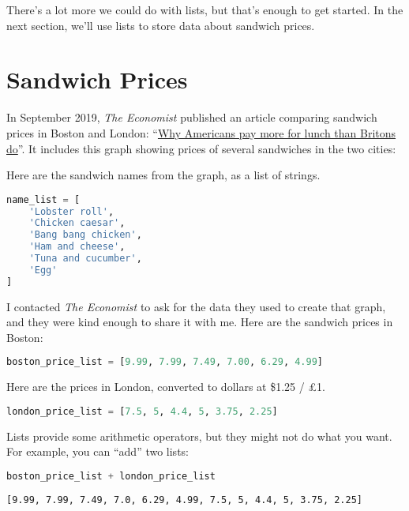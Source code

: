 There's a lot more we could do with lists, but that's enough to get
started. In the next section, we'll use lists to store data about
sandwich prices.

\hypertarget{sandwich-prices}{%
\section{Sandwich Prices}\label{sandwich-prices}}

In September 2019, \emph{The Economist} published an article comparing
sandwich prices in Boston and London:
``\href{https://www.economist.com/finance-and-economics/2019/09/07/why-americans-pay-more-for-lunch-than-britons-do}{Why
Americans pay more for lunch than Britons do}''. It includes this graph
showing prices of several sandwiches in the two cities:

Here are the sandwich names from the graph, as a list of strings.

\begin{lstlisting}[language=Python,style=source]
name_list = [
    'Lobster roll',
    'Chicken caesar',
    'Bang bang chicken',
    'Ham and cheese',
    'Tuna and cucumber',
    'Egg'
]
\end{lstlisting}

I contacted \emph{The Economist} to ask for the data they used to create
that graph, and they were kind enough to share it with me. Here are the
sandwich prices in Boston:

\begin{lstlisting}[language=Python,style=source]
boston_price_list = [9.99, 7.99, 7.49, 7.00, 6.29, 4.99]
\end{lstlisting}

Here are the prices in London, converted to dollars at \$1.25 / £1.

\begin{lstlisting}[language=Python,style=source]
london_price_list = [7.5, 5, 4.4, 5, 3.75, 2.25]
\end{lstlisting}

Lists provide some arithmetic operators, but they might not do what you
want. For example, you can ``add'' two lists:

\begin{lstlisting}[language=Python,style=source]
boston_price_list + london_price_list
\end{lstlisting}

\begin{lstlisting}[style=output]
[9.99, 7.99, 7.49, 7.0, 6.29, 4.99, 7.5, 5, 4.4, 5, 3.75, 2.25]
\end{lstlisting}

